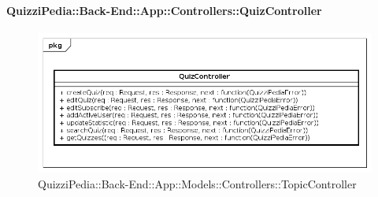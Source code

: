 \paragraph{QuizziPedia::Back-End::App::Controllers::QuizController}
\label{QuizziPedia::Back-End::App::Controllers::QuizController}
\begin{figure}
	\centering
	\includegraphics[scale=0.45]{UML/Classi/Back-End/QuizziPedia_Back-End_App_Controllers_quizController.png}
	\caption{QuizziPedia::Back-End::App::Models::Controllers::TopicController}
\end{figure}

